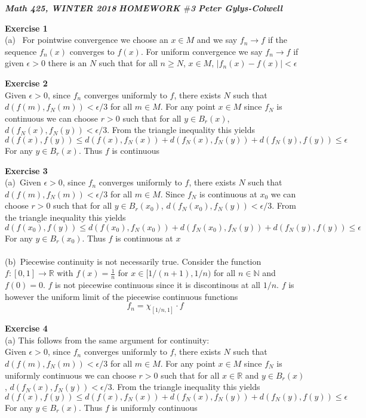 \documentclass[12pt]{article}
\newenvironment{ques}[1]{\textbf{Exercise #1}\vspace{1 mm}\\ }{\bigskip}
\theoremstyle{definition}
\newcommand{\R}{\mathbb R}
\newcommand{\N}{\mathbb N}
\begin{document}
\noindent \textit{\textbf{Math 425, WINTER 2018}} \hspace{1.3cm}
\textit{\textbf{HOMEWORK $\#$3}} \hspace{1.3cm} \textit{\textbf{Peter
Gylys-Colwell}} 

\vspace{1cm}

\begin{ques}{1}
	(a) \ For pointwise convergence we choose an $x \in M$ and we say $f_n \to
	f$ if the sequence $f_n(x)$ converges to $f(x)$. For uniform convergence we
	say $f_n \to f$ if given $\epsilon > 0$ there is an $N$ such that for all
	$n \geq N$, $x \in M$, $|f_n(x) - f(x)| < \epsilon$
\end{ques}

\begin{ques}{2}
	Given $\epsilon > 0$, since $f_n$ converges uniformly to $f$, there exists
	$N$ such that $d(f(m),f_N(m)) < \epsilon / 3$ for all $m \in M$. For any
	point $x \in M$ since $f_N$ is continuous we can choose $r > 0$ such that
	for all $y \in B_r(x)$, $d(f_N(x),f_N(y)) < \epsilon / 3$. From the
	triangle inequality this yields
	$$d(f(x),f(y)) \leq d(f(x),f_N(x)) + d(f_N(x),f_N(y)) + d(f_N(y),f(y)) \leq
	\epsilon$$
	For any $y \in B_r(x)$. Thus $f$ is continuous
\end{ques}

\begin{ques}{3}
	(a)\ 
	Given $\epsilon > 0$, since $f_n$ converges uniformly to $f$, there exists
	$N$ such that $d(f(m),f_N(m)) < \epsilon / 3$ for all $m \in M$. Since
	$f_N$ is continuous at $x_0$ we can choose $r > 0$ such that for all $y \in
	B_r(x_0)$, $d(f_N(x_0),f_N(y)) < \epsilon / 3$. From the triangle
	inequality this yields
	$$d(f(x_0),f(y)) \leq d(f(x_0),f_N(x_0)) + d(f_N(x_0),f_N(y)) +
	d(f_N(y),f(y)) \leq \epsilon$$
	For any $y \in B_r(x_0)$. Thus $f$ is continuous at $x$\\
	\\
	(b)\ Piecewise continuity is not necessarily true. Consider the function
	$f:[0,1] \to \R$ with $f(x) = \frac 1 n$ for $x \in [1/(n+1), 1/n)$ for all
	$n \in \N$ and $f(0) = 0$. $f$ is not piecewise continuous since it is
	discontinous at all $1/n$. $f$ is however the uniform limit of the
	piecewise continuous functions
	$$f_n = \chi_{[1/n,1]} \cdot f$$
\end{ques}

\begin{ques}{4}
	(a) This follows from the same argument for continuity:\\
	Given $\epsilon > 0$, since $f_n$ converges uniformly to $f$, there exists
	$N$ such that $d(f(m),f_N(m)) < \epsilon / 3$ for all $m \in M$. For any
	point $x \in M$ since $f_N$ is uniformly continuous we can choose $r > 0$ such that
	for all $x \in \R$ and $y \in B_r(x)$, $d(f_N(x),f_N(y)) < \epsilon / 3$. From the
	triangle inequality this yields
	$$d(f(x),f(y)) \leq d(f(x),f_N(x)) + d(f_N(x),f_N(y)) + d(f_N(y),f(y)) \leq
	\epsilon$$
	For any $y \in B_r(x)$. Thus $f$ is uniformly continuous
\end{ques}
\end{document}
